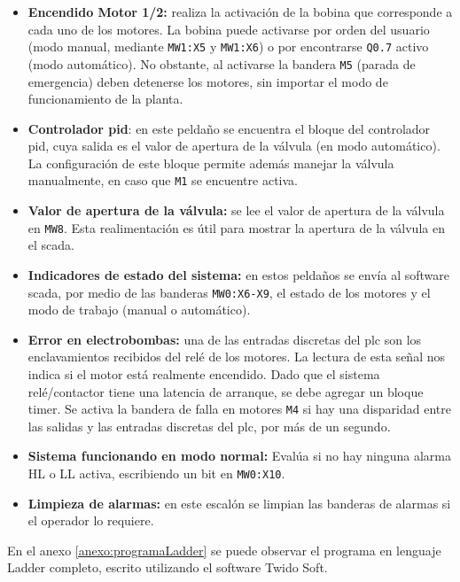 \begin{itemize}
  \item \textbf{Encendido Motor 1/2:}
  realiza la activación de la bobina que corresponde a cada uno de los motores.
  La bobina puede activarse por orden del usuario (modo manual, mediante
\verb|MW1:X5| y \verb|MW1:X6|) o por
encontrarse \verb|Q0.7| activo (modo automático).
 No obstante, al activarse la bandera \verb|M5| (parada de emergencia) deben
detenerse
 los motores, sin importar el modo de funcionamiento de la planta.

  \item \textbf{Controlador \gls{pid}}: en este peldaño se encuentra el bloque
del controlador \gls{pid}, cuya salida es el valor de apertura de la
válvula (en modo automático).
  La configuración de este bloque permite además manejar la válvula
manualmente, en caso que \verb|M1| se encuentre activa.

  \item \textbf{Valor de apertura de la válvula:} se lee el valor de apertura de
la válvula en \verb|MW8|. Esta realimentación es útil para mostrar
la apertura de la válvula en el \gls{scada}.

  \item \textbf{Indicadores de estado del sistema:} en estos peldaños se envía
al software \gls{scada}, por medio de las banderas \verb|MW0:X6-X9|,
  el estado de los motores y el modo de trabajo (manual o automático).

  \item \textbf{Error en electrobombas:} una de las entradas discretas del
\gls{plc}
son los enclavamientos recibidos del relé de los motores. La lectura de esta
señal nos indica si el motor está realmente encendido.
  Dado que el sistema relé/contactor tiene una latencia de arranque, se debe
agregar un bloque timer.
Se activa la bandera de falla en motores \verb|M4| si hay
una disparidad entre las
salidas y las entradas discretas del \gls{plc}, por más de un segundo.

  \item \textbf{Sistema funcionando en modo normal:}
  Evalúa si no hay ninguna alarma HL o LL activa, escribiendo un bit en
\verb|MW0:X10|.

  \item \textbf{Limpieza de alarmas:} en este escalón se limpian las banderas
de alarmas si el operador lo requiere.
\end{itemize}

En el anexo \ref{anexo:programaLadder} se puede
observar el programa en
lenguaje Ladder completo, escrito utilizando el software Twido Soft.

